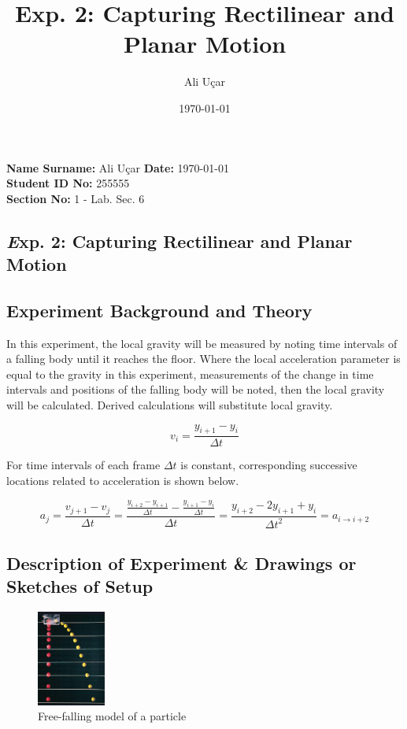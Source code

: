 \documentclass[a4paper, 12pt]{article}
\newcommand{\head}[1]{\section{\normalsize \textit #1}}
\newcommand{\subhead}[1]{\subsection{\normalsize #1}}
\begin{document}
    \title{Exp. 2: Capturing Rectilinear and Planar Motion}
    \author{Ali Uçar}
    \date{\today}
    \noindent
    \textbf{Name Surname:} Ali Uçar
    \hfill
    \textbf{Date:} \today \\
    \textbf{Student ID No:} 255555 \\
    \textbf{Section No:} 1 - Lab. Sec. 6

    \begin{center}
        \head{Exp. 2: Capturing Rectilinear and Planar Motion}
    \end{center}

    \subhead{Experiment Background and Theory}
    In this experiment, the local gravity will be measured by noting time intervals of a falling body until it
    reaches the floor. Where the local acceleration parameter is equal to the gravity in this experiment,
    measurements of the change in time intervals and positions of the falling body will be noted, then the
    local gravity will be calculated. Derived calculations will substitute local gravity.

    \begin{equation}
        v_i = \frac{y_{i+1} - y_i}{\Delta t}
    \end{equation}

    For time intervals of each frame $\Delta t$ is constant, corresponding successive locations related to 
    acceleration is shown below.

    \begin{equation}
        a_j = \frac{v_{j+1} - v_j}{\Delta t} = \frac{\frac{y_{i+2}-y_{i+1}}{\Delta t} - \frac{y_{i+1}-y_{i}}{\Delta t}}{\Delta t} =
        \frac{y_{i+2}-2y_{i+1}+y_i}{{\Delta t}^2} = a_{i \rightarrow i+2}
        \label{eq:accel}
    \end{equation}

    \bigskip \noindent

    \subhead{Description of Experiment \& Drawings or Sketches of Setup}
    \begin{figure}
        \includegraphics[width=0.20\textwidth]{./fall.png}
        \caption{Free-falling model of a particle}
    \end{figure}
\end{document}
